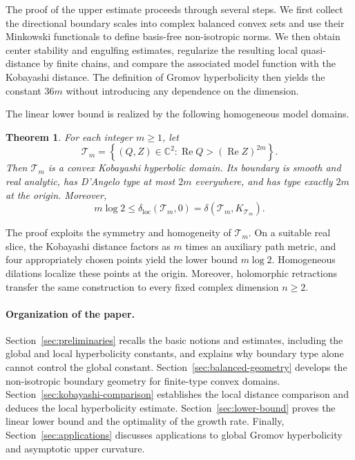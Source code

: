 \documentclass[11pt]{article}
\newtheorem{theorem}{Theorem}[section]
\theoremstyle{definition}
\begin{document}
The proof of the upper estimate proceeds through several steps.  We first collect
the directional boundary scales into complex balanced convex sets and use their
Minkowski functionals to define basis-free non-isotropic norms.  We then obtain
center stability and engulfing estimates, regularize the resulting local
quasi-distance by finite chains, and compare the associated model function
with the Kobayashi distance.  The definition of Gromov
hyperbolicity then yields the constant \(36m\) without introducing any
dependence on the dimension.

The linear lower bound is realized by the following homogeneous
model domains.

\begin{theorem}\label{thm:linear-lower-intro}
For each integer $m\geq1$, let
\[
\mathcal T_m
=
\left\{(Q,Z)\in\mathbb C^2:
\operatorname{Re}Q>(\operatorname{Re}Z)^{2m}\right\}.
\]
Then $\mathcal T_m$ is a convex Kobayashi hyperbolic domain. Its boundary is
smooth and real analytic, has D'Angelo type at most $2m$ everywhere, and has
type exactly $2m$ at the origin. Moreover,
\[
m\log 2
\leq
\delta_{\mathrm{loc}}(\mathcal T_m,0)
=
\delta(\mathcal T_m,K_{\mathcal T_m}).
\]
\end{theorem}

The proof exploits the symmetry and homogeneity of $\mathcal T_m$. On a
suitable real slice, the Kobayashi distance factors as $m$ times an auxiliary
path metric, and four appropriately chosen points yield the lower bound
$m\log 2$. Homogeneous dilations localize these points at the origin. Moreover,
holomorphic retractions transfer the same construction to every fixed
complex dimension \(n\ge2\).

\paragraph{Organization of the paper.}
Section~\ref{sec:preliminaries} recalls the basic notions and estimates,
including the global and local hyperbolicity constants, and explains
why boundary type alone cannot control the global constant.
Section~\ref{sec:balanced-geometry} develops the non-isotropic boundary
geometry for finite-type convex domains.
Section~\ref{sec:kobayashi-comparison} establishes the local distance
comparison and deduces the local hyperbolicity estimate.
Section~\ref{sec:lower-bound} proves the linear lower bound and the
optimality of the growth rate.
Finally, Section~\ref{sec:applications} discusses applications to
global Gromov hyperbolicity and asymptotic upper curvature.
\end{document}
